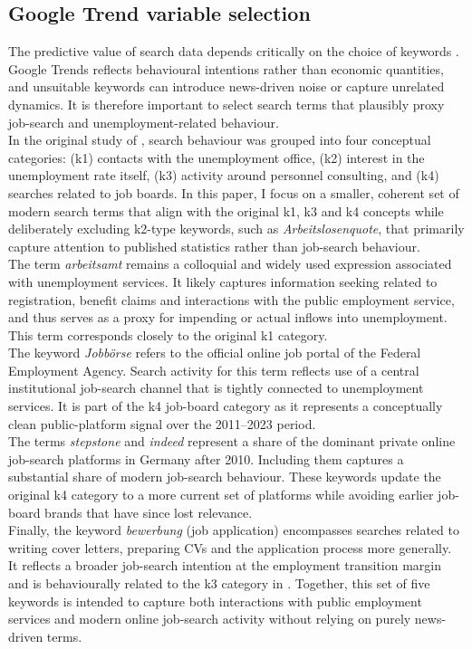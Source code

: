\documentclass[12pt,a4paper]{article}
\begin{document}
\subsection{Google Trend variable selection}
The predictive value of search data depends critically on the choice of keywords \citep{varian}. 
Google Trends reflects behavioural intentions rather than economic quantities, 
and unsuitable keywords can introduce news-driven noise or capture unrelated dynamics. 
It is therefore important to select search terms that plausibly proxy job-search and unemployment-related behaviour. \\
In the original study of \citet{Askitas}, search behaviour was grouped into four conceptual categories: (k1) contacts with the unemployment office, (k2) interest in the unemployment rate itself, (k3) activity around personnel consulting, and (k4) searches related to job boards. In this paper, I focus on a smaller, coherent set of modern search terms that align with the original k1, k3 and k4 concepts while deliberately excluding k2-type keywords, such as \textit{Arbeitslosenquote}, that primarily capture attention to published statistics rather than job-search behaviour.\\
The term \textit{arbeitsamt} remains a colloquial and widely used expression associated with unemployment services. It likely captures information seeking related to registration, benefit claims and interactions with the public employment service, and thus serves as a proxy for impending or actual inflows into unemployment. This term corresponds closely to the original k1 category.\\
The keyword \textit{Jobbörse} refers to the official online job portal of the Federal Employment Agency. Search activity for this term reflects use of a central institutional job-search channel that is tightly connected to unemployment services. It is part of the k4 job-board category as it represents a conceptually clean public-platform signal over the 2011--2023 period.\\
The terms \textit{stepstone} and \textit{indeed} represent a share of the dominant private online job-search platforms in Germany after 2010. Including them captures a substantial share of modern job-search behaviour. These keywords update the original k4 category to a more current set of platforms while avoiding earlier job-board brands that have since lost relevance.\\
Finally, the keyword \textit{bewerbung} (job application) encompasses searches related to writing cover letters, preparing CVs and the application process more generally. It reflects a broader job-search intention at the employment transition margin and is behaviourally related to the k3 category in \citet{Askitas}. Together, this set of five keywords is intended to capture both interactions with public employment services and modern online job-search activity without relying on purely news-driven terms.
\end{document}
